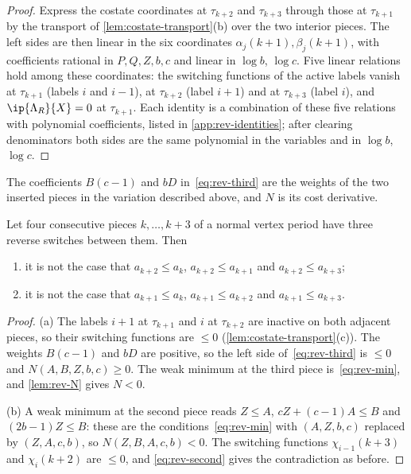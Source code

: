 \begin{proof}
Express the costate coordinates at $\tau_{k+2}$ and $\tau_{k+3}$ through those at $\tau_{k+1}$ by
the transport of \cref{lem:costate-transport}(b) over the two interior pieces. The left sides
are then linear in the six coordinates $\alpha_j(k+1),\beta_j(k+1)$, with coefficients rational
in $P,Q,Z,b,c$ and linear in $\log b$, $\log c$. Five linear relations hold among these
coordinates: the switching functions of the active labels vanish at
$\tau_{k+1}$ (labels $i$ and $i-1$), at $\tau_{k+2}$ (label $i+1$) and at $\tau_{k+3}$ (label $i$),
and $\ip{\Lambda_R}{X}=0$ at $\tau_{k+1}$. Each identity is a combination of these five relations
with polynomial coefficients, listed in \cref{app:rev-identities}; after clearing denominators
both sides are the same polynomial in the variables and in $\log b$, $\log c$.
\end{proof}

The coefficients $B(c-1)$ and $bD$ in~\eqref{eq:rev-third} are the weights of the two
inserted pieces in the variation described above, and $N$ is its cost derivative.

\begin{lemma}\label{lem:reverse-four}
Let four consecutive pieces $k,\dots,k+3$ of a normal vertex period have three reverse switches
between them. Then
\begin{enumerate}[label=\textup{(\alph*)}]
\item it is not the case that $a_{k+2}\le a_k$, $a_{k+2}\le a_{k+1}$ and $a_{k+2}\le a_{k+3}$;
\item it is not the case that $a_{k+1}\le a_k$, $a_{k+1}\le a_{k+2}$ and $a_{k+1}\le a_{k+3}$.
\end{enumerate}
\end{lemma}

\begin{proof}
(a) The labels $i+1$ at $\tau_{k+1}$ and $i$ at $\tau_{k+2}$ are inactive on both adjacent pieces,
so their switching functions are $\le0$ (\cref{lem:costate-transport}(c)). The weights
$B(c-1)$ and $bD$ are positive, so the left side of~\eqref{eq:rev-third} is $\le0$
and $N(A,B,Z,b,c)\ge0$. The weak minimum at the third piece is~\eqref{eq:rev-min}, and
\cref{lem:rev-N} gives $N<0$.

(b) A weak minimum at the second piece reads $Z\le A$, $cZ+(c-1)A\le B$ and $(2b-1)Z\le B$: these
are the conditions~\eqref{eq:rev-min} with $(A,Z,b,c)$ replaced by $(Z,A,c,b)$, so
$N(Z,B,A,c,b)<0$. The switching functions $\chi_{i-1}(k+3)$ and $\chi_i(k+2)$ are $\le0$, and
\eqref{eq:rev-second} gives the contradiction as before.
\end{proof}

